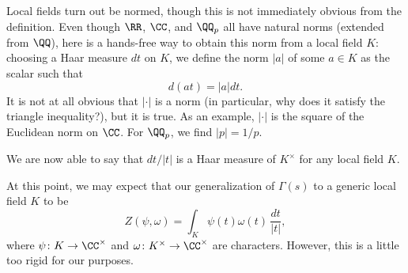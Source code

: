 \documentclass{article}
\begin{document}
\begin{remark}
	Local fields turn out be normed, though this is not immediately obvious from the definition. Even though $\RR$, $\CC$, and $\QQ_p$ all have natural norms (extended from $\QQ$), here is a hands-free way to obtain this norm from a local field $K$: choosing a Haar measure $dt$ on $K$, we define the norm $\left|a\right|$ of some $a\in K$ as the scalar such that
	\[d(at)=\left|a\right|dt.\]
	It is not at all obvious that $\left|\cdot\right|$ is a norm (in particular, why does it satisfy the triangle inequality?), but it is true. As an example, $\left|\cdot\right|$ is the square of the Euclidean norm on $\CC$. For $\QQ_p$, we find $\left|p\right|=1/p$.
\end{remark}
\begin{example}
	We are now able to say that $dt/\left|t\right|$ is a Haar measure of $K^\times$ for any local field $K$.
\end{example}
At this point, we may expect that our generalization of $\Gamma(s)$ to a generic local field $K$ to be
\[Z(\psi,\omega)=\int_K\psi(t)\omega(t)\,\frac{dt}{\left|t\right|},\]
where $\psi\colon K\to\CC^\times$ and $\omega\colon K^\times\to\CC^\times$ are characters. However, this is a little too rigid for our purposes.
\end{document}
